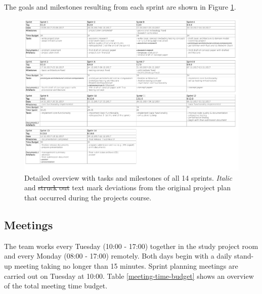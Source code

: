 The goals and milestones resulting from each sprint are shown in Figure \ref{fig:sprint-details}.

\begin{figure}[h]
	\begin{sideways}
	\includegraphics[scale=0.75]{resources/sprint_details_updated}
	\end{sideways}
	\centering
	\caption{Detailed overview with tasks and milestones of all 14 sprints. \textit{Italic} and \sout{struck out} text mark deviations from the original project plan that occurred during the projects course.}
	\label{fig:sprint-details}
\end{figure}


\subsection{Meetings}

The team works every Tuesday (10:00 - 17:00) together in the study project room and every Monday (08:00 - 17:00) remotely. Both days begin with a daily stand-up meeting taking no longer than 15 minutes. Sprint planning meetings are carried out on Tuesday at 10:00. Table \ref{meeting-time-budget} shows an overview of the total meeting time budget.

